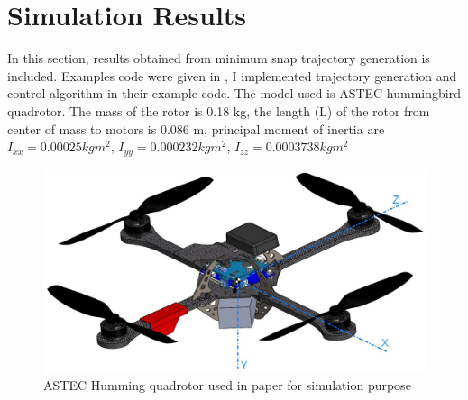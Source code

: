 \documentclass[conference,onecolumn,10pt]{IEEEtran}
\begin{document}
\section{Simulation Results}
In this section, results obtained from minimum snap trajectory generation is included. Examples code were given in \cite{AerialRobotics} \cite{AerialRobotics1}, I implemented trajectory generation and control algorithm in their example code. The model used is ASTEC hummingbird quadrotor. The mass of the rotor is 0.18 kg, the length (L) of the rotor from center of mass to motors is 0.086 m, principal moment of inertia are $I_{xx} = 0.00025 kgm^2$, $I_{yy} = 0.000232 kgm^2$, $I_{zz} = 0.0003738 kgm^2$
\begin{figure}[h!]
\centering
\includegraphics[scale=0.2]{images/Quad.jpg}
\caption{ASTEC Humming quadrotor used in paper for simulation purpose \cite{mellinger2011minimum} \cite{wiki1}}
\label{Quadmodel}
\end{figure}
\end{document}
